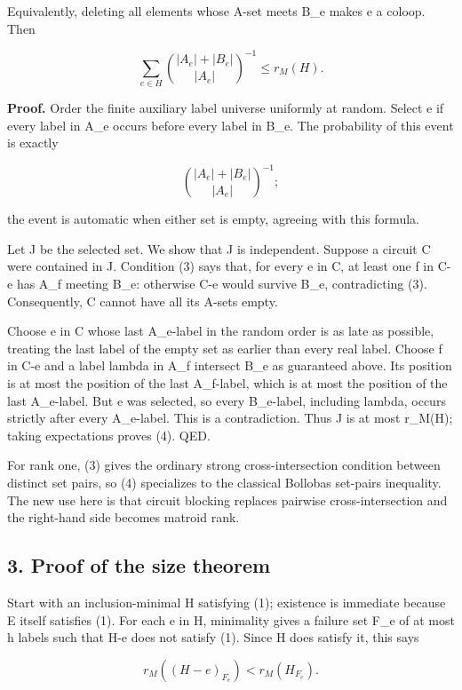 Equivalently, deleting all elements whose A-set meets B\_e makes e a coloop. Then

\[
\boxed{\sum_{e\in H}\binom{|A_e|+|B_e|}{|A_e|}^{-1}\le r_M(H).} \tag{4}
\]

\textbf{Proof.} Order the finite auxiliary label universe uniformly at random. Select e if every label in A\_e occurs before every label in B\_e. The probability of this event is exactly

\[
\binom{|A_e|+|B_e|}{|A_e|}^{-1};
\]

the event is automatic when either set is empty, agreeing with this formula.

Let J be the selected set. We show that J is independent. Suppose a circuit C were contained in J. Condition (3) says that, for every e in C, at least one f in C-e has A\_f meeting B\_e: otherwise C-e would survive B\_e, contradicting (3). Consequently, C cannot have all its A-sets empty.

Choose e in C whose last A\_e-label in the random order is as late as possible, treating the last label of the empty set as earlier than every real label. Choose f in C-e and a label lambda in A\_f intersect B\_e as guaranteed above. Its position is at most the position of the last A\_f-label, which is at most the position of the last A\_e-label. But e was selected, so every B\_e-label, including lambda, occurs strictly after every A\_e-label. This is a contradiction. Thus \textbar J\textbar{} is at most r\_M(H); taking expectations proves (4). QED.

For rank one, (3) gives the ordinary strong cross-intersection condition between distinct set pairs, so (4) specializes to the classical Bollobas set-pairs inequality. The new use here is that circuit blocking replaces pairwise cross-intersection and the right-hand side becomes matroid rank.

\hypertarget{af-4c0863a692-proof-of-the-size-theorem}{%
\subsection{3. Proof of the size theorem}\label{af-4c0863a692-proof-of-the-size-theorem}}

Start with an inclusion-minimal H satisfying (1); existence is immediate because E itself satisfies (1). For each e in H, minimality gives a failure set F\_e of at most h labels such that H-e does not satisfy (1). Since H does satisfy it, this says

\[
r_M((H-e)_{F_e})<r_M(H_{F_e}). \tag{5}
\]

